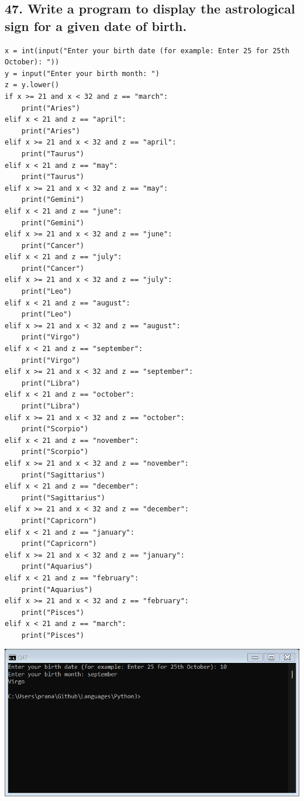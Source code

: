 \documentclass[12pt]{article}
\begin{document}
\subsection*{47. Write a program to display the astrological sign for a given date of birth.}
\begin{verbatim}
x = int(input("Enter your birth date (for example: Enter 25 for 25th October): "))
y = input("Enter your birth month: ")
z = y.lower()
if x >= 21 and x < 32 and z == "march":
    print("Aries")
elif x < 21 and z == "april":
    print("Aries")
elif x >= 21 and x < 32 and z == "april":
    print("Taurus")
elif x < 21 and z == "may":
    print("Taurus")
elif x >= 21 and x < 32 and z == "may":
    print("Gemini")
elif x < 21 and z == "june":
    print("Gemini")
elif x >= 21 and x < 32 and z == "june":
    print("Cancer")
elif x < 21 and z == "july":
    print("Cancer")
elif x >= 21 and x < 32 and z == "july":
    print("Leo")
elif x < 21 and z == "august":
    print("Leo")
elif x >= 21 and x < 32 and z == "august":
    print("Virgo")
elif x < 21 and z == "september":
    print("Virgo")
elif x >= 21 and x < 32 and z == "september":
    print("Libra")
elif x < 21 and z == "october":
    print("Libra")
elif x >= 21 and x < 32 and z == "october":
    print("Scorpio")
elif x < 21 and z == "november":
    print("Scorpio")
elif x >= 21 and x < 32 and z == "november":
    print("Sagittarius")
elif x < 21 and z == "december":
    print("Sagittarius")
elif x >= 21 and x < 32 and z == "december":
    print("Capricorn")
elif x < 21 and z == "january":
    print("Capricorn")
elif x >= 21 and x < 32 and z == "january":
    print("Aquarius")
elif x < 21 and z == "february":
    print("Aquarius")
elif x >= 21 and x < 32 and z == "february":
    print("Pisces")
elif x < 21 and z == "march":
    print("Pisces")
\end{verbatim}
\includegraphics[width=\linewidth]{images/47.png}
\end{document}
